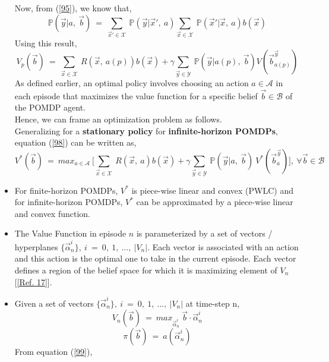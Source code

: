 \documentclass[12pt, draftcls, onecolumn]{IEEEtran}
\begin{document}
\begin{itemize}
    Now, from (\ref{95}), we know that,
    \begin{equation*}
        \mathbb{P}(\vec{y}|a,\ \vec{b})\ =\ \sum_{\vec{x}' \in \mathcal{X}}\ \mathbb{P}(\vec{y}|\vec{x}',\ a)\sum_{\vec{x} \in \mathcal{X}}\ \mathbb{P}(\vec{x}'|\vec{x},\ a)b(\vec{x})
    \end{equation*}
    Using this result,
    \begin{equation}\label{98}
        V_p(\vec{b})\ =\ \sum_{\vec{x} \in \mathcal{X}}\ R(\vec{x},\ a(p))b(\vec{x}) + \gamma \sum_{\vec{y} \in \mathcal{Y}}\ \mathbb{P}(\vec{y}|a(p),\ \vec{b})V(\vec{b}_{a(p)}^{\vec{y}})
    \end{equation}
    As defined earlier, an optimal policy involves choosing an action $a \in \mathcal{A}$ in each episode that maximizes the value function for a specific belief $\vec{b} \in \mathcal{B}$ of the POMDP agent.
    \\Hence, we can frame an optimization problem as follows.
    \\Generalizing for a \textbf{stationary policy} for \textbf{infinite-horizon POMDPs}, equation (\ref{98}) can be written as,
    \begin{equation}\label{99}
        V^*(\vec{b})\ =\ max_{a \in \mathcal{A}}\ \Big[\sum_{\vec{x} \in \mathcal{X}}\ R(\vec{x},\ a)b(\vec{x}) + \gamma \sum_{\vec{y} \in \mathcal{Y}}\ \mathbb{P}(\vec{y}|a,\ \vec{b})\ V^*(\vec{b}_a^{\vec{y}})\Big],\ \forall \vec{b} \in \mathcal{B}
    \end{equation}
    \item For finite-horizon POMDPs, $V^*$ is piece-wise linear and convex (PWLC) and for infinite-horizon POMDPs, $V^*$ can be approximated by a piece-wise linear and convex function.
    \item The Value Function in episode $n$ is parameterized by a set of vectors / hyperplanes $\{\vec{\alpha}^i_n\},\ i\ =\ 0,\ 1,\ ...,\ |V_n|$. Each vector is associated with an action and this action is the optimal one to take in the current episode. Each vector defines a region of the belief space for which it is maximizing element of $V_n$ [\ref{Ref. 17}].
    \item Given a set of vectors $\{\vec{\alpha}_n^i\},\ i\ =\ 0,\ 1,\ ...,\ |V_n|$ at time-step n,
    \begin{equation}\label{100}
        V_n(\vec{b})\ =\ max_{\vec{\alpha}^i_n}\ \vec{b} \cdot \vec{\alpha}^i_n
    \end{equation}
    \[\pi(\vec{b})\ =\ a(\vec{\alpha}^i_n)\]
    From equation (\ref{99}),

\end{itemize}
\end{document}
